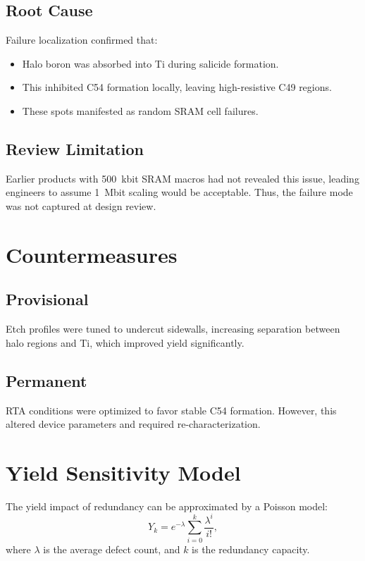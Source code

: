 \documentclass[conference]{IEEEtran}
\begin{document}
\subsection{Root Cause}
Failure localization confirmed that:
\begin{itemize}
  \item Halo boron was absorbed into Ti during salicide formation.
  \item This inhibited C54 formation locally, leaving high-resistive C49 regions.
  \item These spots manifested as random SRAM cell failures.
\end{itemize}

\subsection{Review Limitation}
Earlier products with 500~kbit SRAM macros had not revealed this issue, leading engineers to assume 1~Mbit scaling would be acceptable.  
Thus, the failure mode was not captured at design review.

\section{Countermeasures}
\subsection{Provisional}
Etch profiles were tuned to undercut sidewalls, increasing separation between halo regions and Ti, which improved yield significantly.

\subsection{Permanent}
RTA conditions were optimized to favor stable C54 formation.  
However, this altered device parameters and required re-characterization.

\section{Yield Sensitivity Model}
The yield impact of redundancy can be approximated by a Poisson model:
\[
Y_k = e^{-\lambda} \sum_{i=0}^{k} \frac{\lambda^i}{i!},
\]
where $\lambda$ is the average defect count, and $k$ is the redundancy capacity.
\end{document}
